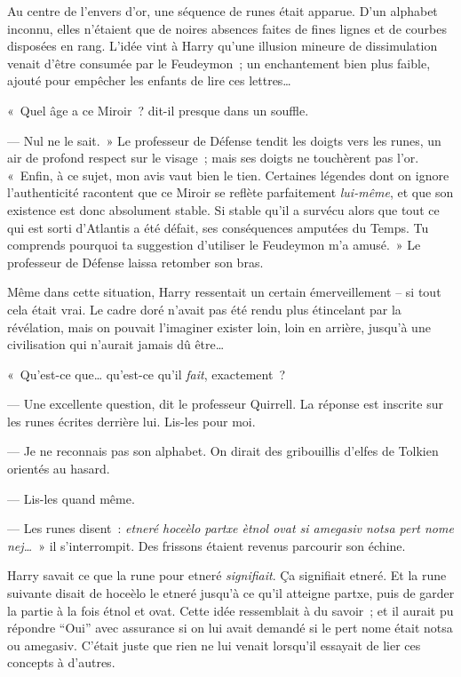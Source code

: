 Au centre de l'envers d'or, une séquence de runes était apparue.
D'un alphabet inconnu, elles n'étaient que de noires absences faites de fines lignes et de courbes disposées en rang.
L'idée vint à Harry qu'une illusion mineure de dissimulation venait d'être consumée par le Feudeymon~; un enchantement bien plus faible, ajouté pour empêcher les enfants de lire ces lettres…

«~Quel âge a ce Miroir~? dit-il presque dans un souffle.

--- Nul ne le sait.~»
Le professeur de Défense tendit les doigts vers les runes, un air de profond respect sur le visage~; mais ses doigts ne touchèrent pas l'or.
«~Enfin, à ce sujet, mon avis vaut bien le tien.
Certaines légendes dont on ignore l'authenticité racontent que ce Miroir se reflète parfaitement \emph{lui-même}, et que son existence est donc absolument stable.
Si stable qu'il a survécu alors que tout ce qui est sorti d'Atlantis a été défait, ses conséquences amputées du Temps.
Tu comprends pourquoi ta suggestion d'utiliser le Feudeymon m'a amusé.~»
Le professeur de Défense laissa retomber son bras.

Même dans cette situation, Harry ressentait un certain émerveillement -- si tout cela était vrai.
Le cadre doré n'avait pas été rendu plus étincelant par la révélation, mais on pouvait l'imaginer exister loin, loin en arrière, jusqu'à une civilisation qui n'aurait jamais dû être…

«~Qu'est-ce que… qu'est-ce qu'il \emph{fait}, exactement~?

--- Une excellente question, dit le professeur Quirrell.
La réponse est inscrite sur les runes écrites derrière lui.
Lis-les pour moi.

--- Je ne reconnais pas son alphabet.
On dirait des gribouillis d'elfes de Tolkien orientés au hasard.

--- Lis-les quand même.

--- Les runes disent~: \emph{etneré hoceèlo partxe ètnol ovat si amegasiv notsa pert nome nej…}~» il s'interrompit.
Des frissons étaient revenus parcourir son échine.

Harry savait ce que la rune pour etneré \emph{signifiait}.
Ça signifiait etneré.
Et la rune suivante disait de hoceèlo le etneré jusqu'à ce qu'il atteigne partxe, puis de garder la partie à la fois étnol et ovat.
Cette idée ressemblait à du savoir~; et il aurait pu répondre “Oui” avec assurance si on lui avait demandé si le pert nome était notsa ou amegasiv.
C'était juste que rien ne lui venait lorsqu'il essayait de lier ces concepts à d'autres.

